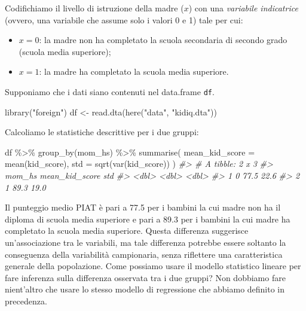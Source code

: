 \documentclass[
]{memoir}
\newenvironment{Shaded}{\begin{snugshade}}{\end{snugshade}}
\newcommand{\AttributeTok}[1]{\textcolor[rgb]{0.77,0.63,0.00}{#1}}
\newcommand{\CommentTok}[1]{\textcolor[rgb]{0.56,0.35,0.01}{\textit{#1}}}
\newcommand{\FunctionTok}[1]{\textcolor[rgb]{0.00,0.00,0.00}{#1}}
\newcommand{\NormalTok}[1]{#1}
\newcommand{\OtherTok}[1]{\textcolor[rgb]{0.56,0.35,0.01}{#1}}
\newcommand{\SpecialCharTok}[1]{\textcolor[rgb]{0.00,0.00,0.00}{#1}}
\newcommand{\StringTok}[1]{\textcolor[rgb]{0.31,0.60,0.02}{#1}}
\begin{document}
Codifichiamo il livello di istruzione della madre (\(x\)) con una \emph{variabile indicatrice} (ovvero, una variabile che assume solo i valori 0 e 1) tale per cui:

\begin{itemize}
\item
  \(x=0\): la madre non ha completato la scuola secondaria di secondo grado (scuola media superiore);
\item
  \(x=1\): la madre ha completato la scuola media superiore.
\end{itemize}

\noindent
Supponiamo che i dati siano contenuti nel data.frame \texttt{df}.

\begin{Shaded}
\begin{Highlighting}[]
\FunctionTok{library}\NormalTok{(}\StringTok{"foreign"}\NormalTok{)}
\NormalTok{df }\OtherTok{\textless{}{-}} \FunctionTok{read.dta}\NormalTok{(}\FunctionTok{here}\NormalTok{(}\StringTok{"data"}\NormalTok{, }\StringTok{"kidiq.dta"}\NormalTok{))}
\end{Highlighting}
\end{Shaded}

\noindent
Calcoliamo le statistiche descrittive per i due gruppi:

\begin{Shaded}
\begin{Highlighting}[]
\NormalTok{df }\SpecialCharTok{\%\textgreater{}\%} 
  \FunctionTok{group\_by}\NormalTok{(mom\_hs) }\SpecialCharTok{\%\textgreater{}\%} 
  \FunctionTok{summarise}\NormalTok{(}
    \AttributeTok{mean\_kid\_score =} \FunctionTok{mean}\NormalTok{(kid\_score),}
    \AttributeTok{std =} \FunctionTok{sqrt}\NormalTok{(}\FunctionTok{var}\NormalTok{(kid\_score))}
\NormalTok{  )}
\CommentTok{\#\textgreater{} \# A tibble: 2 x 3}
\CommentTok{\#\textgreater{}   mom\_hs mean\_kid\_score   std}
\CommentTok{\#\textgreater{}    \textless{}dbl\textgreater{}          \textless{}dbl\textgreater{} \textless{}dbl\textgreater{}}
\CommentTok{\#\textgreater{} 1      0           77.5  22.6}
\CommentTok{\#\textgreater{} 2      1           89.3  19.0}
\end{Highlighting}
\end{Shaded}

\noindent
Il punteggio medio PIAT è pari a 77.5 per i bambini la cui madre non ha il diploma di scuola media superiore e pari a 89.3 per i bambini la cui madre ha completato la scuola media superiore. Questa differenza suggerisce un'associazione tra le variabili, ma tale differenza potrebbe essere soltanto la conseguenza della variabilità campionaria, senza riflettere una caratteristica generale della popolazione. Come possiamo usare il modello statistico lineare per fare inferenza sulla differenza osservata tra i due gruppi? Non dobbiamo fare nient'altro che usare lo stesso modello di regressione che abbiamo definito in precedenza.
\end{document}
